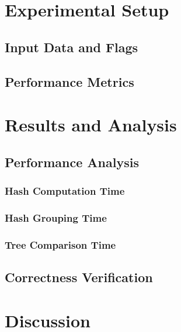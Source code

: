 \documentclass[letterpaper,12pt]{article}
\theoremstyle{remark}
\begin{document}
\section*{Experimental Setup}
\subsection{Input Data and Flags}
\subsection{Performance Metrics}

\section{Results and Analysis}
\subsection{Performance Analysis}
\subsubsection{Hash Computation Time}
\subsubsection{Hash Grouping Time}
\subsubsection{Tree Comparison Time}
\subsection{Correctness Verification}

\section*{Discussion}
\end{document}
